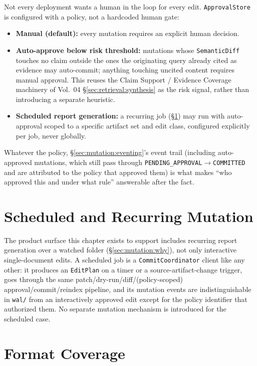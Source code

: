 Not every deployment wants a human in the loop for every edit. \texttt{ApprovalStore} is configured with a policy, not a hardcoded human gate:
\begin{itemize}
  \item \textbf{Manual (default):} every mutation requires an explicit human decision.
  \item \textbf{Auto-approve below risk threshold:} mutations whose \texttt{SemanticDiff} touches no claim outside the ones the originating query already cited as evidence may auto-commit; anything touching uncited content requires manual approval. This reuses the Claim Support / Evidence Coverage machinery of Vol.~04 \S\ref{sec:retrieval:synthesis} as the risk signal, rather than introducing a separate heuristic.
  \item \textbf{Scheduled report generation:} a recurring job (\S\ref{sec:mutation:scheduled}) may run with auto-approval scoped to a specific artifact set and edit class, configured explicitly per job, never globally.
\end{itemize}
Whatever the policy, \S\ref{sec:mutation:eventing}'s event trail (including auto-approved mutations, which still pass through \texttt{PENDING\_APPROVAL}$\to$\texttt{COMMITTED} and are attributed to the policy that approved them) is what makes ``who approved this and under what rule'' answerable after the fact.

\section{Scheduled and Recurring Mutation}
\label{sec:mutation:scheduled}

The product surface this chapter exists to support includes recurring report generation over a watched folder (\S\ref{sec:mutation:why}), not only interactive single-document edits. A scheduled job is a \texttt{CommitCoordinator} client like any other: it produces an \texttt{EditPlan} on a timer or a source-artifact-change trigger, goes through the same patch/dry-run/diff/(policy-scoped) approval/commit/reindex pipeline, and its mutation events are indistinguishable in \texttt{wal/} from an interactively approved edit except for the policy identifier that authorized them. No separate mutation mechanism is introduced for the scheduled case.

\section{Format Coverage}
\label{sec:mutation:formats}

